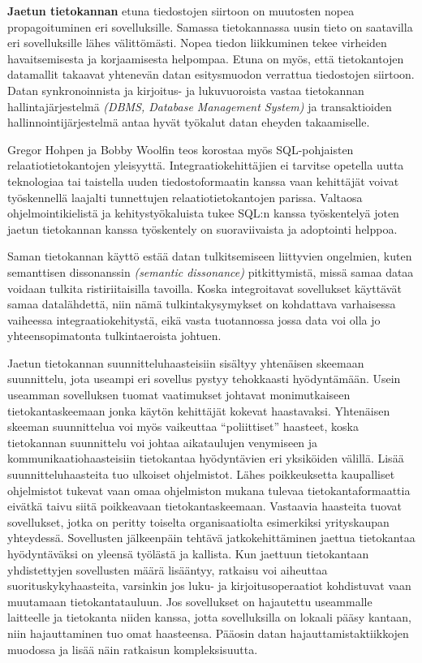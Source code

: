 \textbf{Jaetun tietokannan} etuna tiedostojen siirtoon on muutosten nopea propagoituminen eri sovelluksille. Samassa tietokannassa uusin tieto on saatavilla eri sovelluksille lähes välittömästi. Nopea tiedon liikkuminen tekee virheiden havaitsemisesta ja korjaamisesta helpompaa. Etuna on myös, että tietokantojen datamallit takaavat yhtenevän datan esitysmuodon verrattua tiedostojen siirtoon.
Datan synkronoinnista ja kirjoitus- ja lukuvuoroista vastaa tietokannan hallintajärjestelmä \textit{(DBMS, Database Management System)} ja transaktioiden hallinnointijärjestelmä antaa hyvät työkalut datan eheyden takaamiselle.

Gregor Hohpen ja Bobby Woolfin teos \citep[sivu~69]{Hohpe2004} korostaa myös SQL-pohjaisten relaatiotietokantojen yleisyyttä. Integraatiokehittäjien ei tarvitse opetella uutta teknologiaa tai taistella uuden tiedostoformaatin kanssa vaan kehittäjät voivat työskennellä laajalti tunnettujen relaatiotietokantojen parissa. Valtaosa ohjelmointikielistä ja kehitystyökaluista tukee SQL:n kanssa työskentelyä joten jaetun tietokannan kanssa työskentely on suoraviivaista ja adoptointi helppoa.

Saman tietokannan käyttö estää datan tulkitsemiseen liittyvien ongelmien, kuten semanttisen dissonanssin \textit{(semantic dissonance)} pitkittymistä, missä samaa dataa voidaan tulkita ristiriitaisilla tavoilla. Koska integroitavat sovellukset käyttävät samaa datalähdettä, niin nämä tulkintakysymykset on kohdattava varhaisessa vaiheessa integraatiokehitystä, eikä vasta tuotannossa jossa data voi olla jo yhteensopimatonta tulkintaeroista johtuen. 


Jaetun tietokannan suunnitteluhaasteisiin sisältyy yhtenäisen skeemaan suunnittelu, jota useampi eri sovellus pystyy tehokkaasti hyödyntämään. Usein useamman sovelluksen tuomat vaatimukset johtavat monimutkaiseen tietokantaskeemaan jonka käytön kehittäjät kokevat haastavaksi. Yhtenäisen skeeman suunnittelua voi myös vaikeuttaa ``poliittiset'' haasteet, koska tietokannan suunnittelu voi johtaa aikataulujen venymiseen ja kommunikaatiohaasteisiin tietokantaa hyödyntävien eri yksiköiden välillä.
Lisää suunnitteluhaasteita tuo ulkoiset ohjelmistot. Lähes poikkeuksetta kaupalliset ohjelmistot tukevat vaan omaa ohjelmiston mukana tulevaa tietokantaformaattia eivätkä taivu siitä poikkeavaan tietokantaskeemaan. Vastaavia haasteita tuovat sovellukset, jotka on peritty toiselta organisaatiolta esimerkiksi yrityskaupan yhteydessä. Sovellusten jälkeenpäin tehtävä jatkokehittäminen jaettua tietokantaa hyödyntäväksi on yleensä työlästä ja kallista.
Kun jaettuun tietokantaan yhdistettyjen sovellusten määrä lisääntyy, ratkaisu voi aiheuttaa suorituskykyhaasteita, varsinkin jos luku- ja kirjoitusoperaatiot kohdistuvat vaan muutamaan tietokantatauluun. Jos sovellukset on hajautettu useammalle laitteelle ja tietokanta niiden kanssa, jotta sovelluksilla on lokaali pääsy kantaan, niin hajauttaminen tuo omat haasteensa. Pääosin datan hajauttamistaktiikkojen muodossa ja lisää näin ratkaisun kompleksisuutta.

